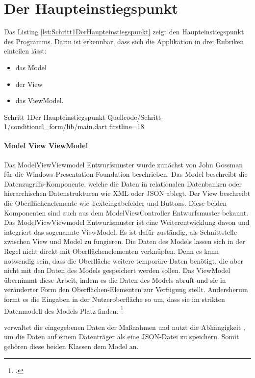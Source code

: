
\ifIncludeFigures \clearpage \fi
\section{Der Haupteinstiegspunkt}

Das Listing \ref{lst:Schritt1DerHaupteinstiegspunkt} zeigt den Haupteinstiegspunkt des Programms.
Darin ist erkennbar, dass sich die Applikation in drei Rubriken einteilen lässt:
\begin{itemize}
  \item das Model 
  \item der View 
  \item das ViewModel. 
\end{itemize}

\begin{alexlisting}{Schritt 1}{Der Haupteinstiegspunkt}
  {Quellcode/Schritt-1/conditional_form/lib/main.dart}
  {firstline=18}
  \label{lst:Schritt1DerHaupteinstiegspunkt}
\end{alexlisting}

\paragraph{Model View ViewModel}
Das ModelViewViewmodel Entwurfsmuster wurde zunächst von John Gossman für die Windows Presentation Foundation beschrieben.
Das Model beschreibt die Datenzugriffs-Komponente, welche die Daten in relationalen Datenbanken oder hierarchischen Datenstrukturen wie XML oder JSON ablegt.
Der View beschreibt die Oberflächenelemente wie Texteingabefelder und Buttons.
Diese beiden Komponenten sind auch aus dem ModelViewController Entwurfsmuster bekannt.
Das ModelViewViewmodel Entwurfsmuster ist eine Weiterentwicklung davon und integriert das sogenannte ViewModel.
Es ist dafür zuständig, als Schnittstelle zwischen View und Model zu fungieren.
Die Daten des Models lassen sich in der Regel nicht direkt mit Oberflächenelementen verknüpfen.
Denn es kann notwendig sein, dass die Oberfläche weitere temporäre Daten benötigt, die aber nicht mit den Daten des Models gespeichert werden sollen.
Das ViewModel übernimmt diese Arbeit, indem es die Daten des Models abruft und sie in veränderter Form den Oberflächen-Elementen zur Verfügung stellt.
Andersherum formt es die Eingaben in der Nutzeroberfläche so um, dass sie im strikten Datenmodell des Models Platz finden.
\footcite[Vgl.][]{IntroductionToModelViewViewModelPatternForBuildingWPFApps}

  verwaltet die eingegebenen Daten der Maßnahmen und nutzt die Abhängigkeit  , um die Daten auf einem Datenträger als eine JSON-Datei zu speichern.
Somit gehören diese beiden Klassen dem Model an.

